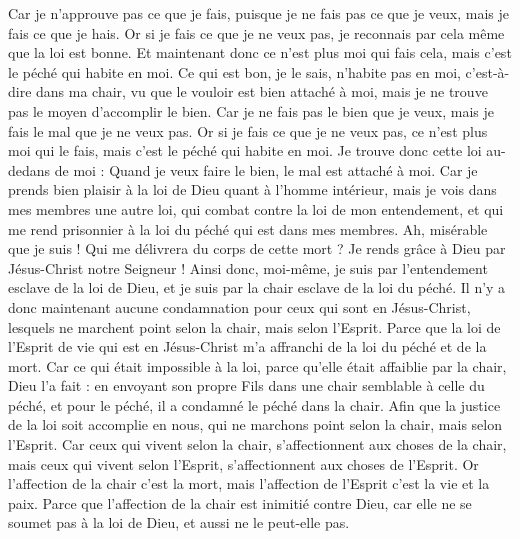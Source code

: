 \begin{multicols}{2}
Car je n'approuve pas ce que je fais, puisque je ne fais pas ce que je veux, mais je fais ce que je hais.
Or si je fais ce que je ne veux pas, je reconnais par cela même que la loi est bonne.
Et maintenant donc ce n'est plus moi qui fais cela, mais c'est le péché qui habite en moi.
Ce qui est bon, je le sais, n'habite pas en moi, c'est-à-dire dans ma chair, vu que le vouloir est bien attaché à moi, mais je ne trouve pas le moyen d'accomplir le bien.
Car je ne fais pas le bien que je veux, mais je fais le mal que je ne veux pas.
Or si je fais ce que je ne veux pas, ce n'est plus moi qui le fais, mais c'est le péché qui habite en moi.
Je trouve donc cette loi au-dedans de moi : Quand je veux faire le bien, le mal est attaché à moi.
Car je prends bien plaisir à la loi de Dieu quant à l'homme intérieur,
mais je vois dans mes membres une autre loi, qui combat contre la loi de mon entendement, et qui me rend prisonnier à la loi du péché qui est dans mes membres.
Ah, misérable que je suis ! Qui me délivrera du corps de cette mort ?
Je rends grâce à Dieu par Jésus-Christ notre Seigneur ! Ainsi donc, moi-même, je suis par l'entendement esclave de la loi de Dieu, et je suis par la chair esclave de la loi du péché.
\VerseOne{}Il n'y a donc maintenant aucune condamnation pour ceux qui sont en Jésus-Christ, lesquels ne marchent point selon la chair, mais selon l'Esprit.
Parce que la loi de l'Esprit de vie qui est en Jésus-Christ m'a affranchi de la loi du péché et de la mort.
Car ce qui était impossible à la loi, parce qu'elle était affaiblie par la chair, Dieu l'a fait : en envoyant son propre Fils dans une chair semblable à celle du péché, et pour le péché, il a condamné le péché dans la chair.
Afin que la justice de la loi soit accomplie en nous, qui ne marchons point selon la chair, mais selon l'Esprit.
Car ceux qui vivent selon la chair, s'affectionnent aux choses de la chair, mais ceux qui vivent selon l'Esprit, s'affectionnent aux choses de l'Esprit.
Or l'affection de la chair c'est la mort, mais l'affection de l'Esprit c'est la vie et la paix.
Parce que l'affection de la chair est inimitié contre Dieu, car elle ne se soumet pas à la loi de Dieu, et aussi ne le peut-elle pas.

\end{multicols}

